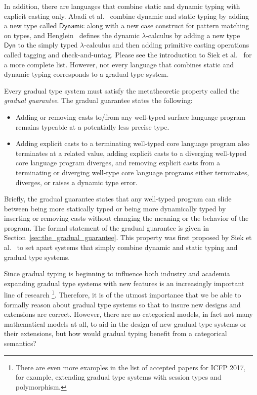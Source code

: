 In addition, there are languages that combine static and dynamic
typing with explicit casting only. Abadi et al.~\cite{Abadi:1989}
combine dynamic and static typing by adding a new type called
$\mathsf{Dynamic}$ along with a new case construct for pattern
matching on types, and Henglein~\cite{Henglein:1994} defines the
dynamic $\lambda$-calculus by adding a new type $\mathsf{Dyn}$ to the
simply typed $\lambda$-calculus and then adding primitive casting
operations called tagging and check-and-untag. Please see the
introduction to Siek et al.~\cite{Siek:2015} for a more complete
list. However, not every language that combines static and dynamic
typing corresponds to a gradual type system.

Every gradual type system must satisfy the metatheoretic property
called the \emph{gradual guarantee}.  The gradual guarantee states the
following:
\begin{itemize}
\item Adding or removing casts to/from any well-typed surface language
  program remains typeable at a potentially less precise type.
\item Adding explicit casts to a terminating well-typed core language
  program also terminates at a related value, adding explicit casts to
  a diverging well-typed core language program diverges, and removing
  explicit casts from a terminating or diverging well-type core
  language programs either terminates, diverges, or raises a dynamic
  type error.
\end{itemize}
Briefly, the gradual guarantee states that any well-typed program can
slide between being more statically typed or being more dynamically
typed by inserting or removing casts without changing the meaning or
the behavior of the program. The formal statement of the gradual
guarantee is given in Section~\ref{sec:the_gradual_guarantee}.  This
property was first proposed by Siek et al.~\cite{Siek:2015} to set
apart systems that simply combine dynamic and static typing and
gradual type systems.

Since gradual typing is beginning to influence both industry and
academia expanding gradual type systems with new features is an
increasingly important line of research
\cite{Siek:2006,Siek:2007,Garcia:2016,
  Lehmann:2017:GRT:3009837.3009856,
  Jafery:2017:SUR:3093333.3009865}\footnote{There are even more
  examples in the list of accepted papers for ICFP 2017, for example,
  extending gradual type systems with session types and
  polymorphism.}.  Therefore, it is of the utmost importance that we
be able to formally reason about gradual type systems so that to
insure new designs and extensions are correct.  However, there are no
categorical models, in fact not many mathematical models at all, to
aid in the design of new gradual type systems or their extensions, but
how would gradual typing benefit from a categorical semantics?

